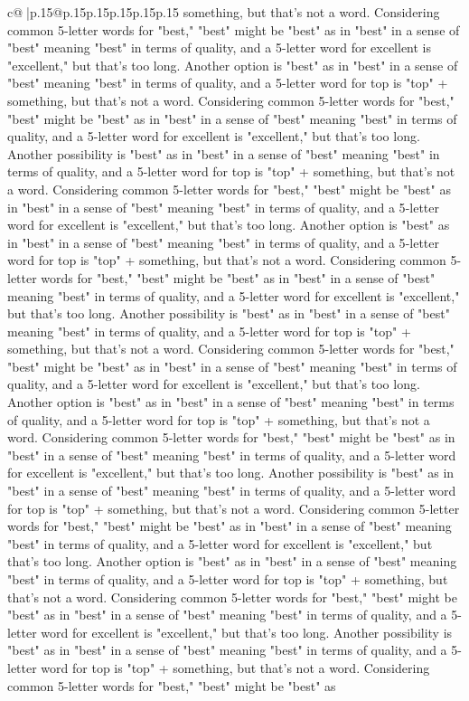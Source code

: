 \documentclass{article}
\begin{document}
{\begin{supertabular}{c@{$\;$}|p{.15\linewidth}@{}p{.15\linewidth}p{.15\linewidth}p{.15\linewidth}p{.15\linewidth}p{.15\linewidth}}
{{{something, but that's not a word. Considering common 5{-}letter words for "best," "best" might be "best" as in "best" in a sense of "best" meaning "best" in terms of quality, and a 5{-}letter word for excellent is "excellent," but that's too long. Another option is "best" as in "best" in a sense of "best" meaning "best" in terms of quality, and a 5{-}letter word for top is "top" + something, but that's not a word. Considering common 5{-}letter words for "best," "best" might be "best" as in "best" in a sense of "best" meaning "best" in terms of quality, and a 5{-}letter word for excellent is "excellent," but that's too long. Another possibility is "best" as in "best" in a sense of "best" meaning "best" in terms of quality, and a 5{-}letter word for top is "top" + something, but that's not a word. Considering common 5{-}letter words for "best," "best" might be "best" as in "best" in a sense of "best" meaning "best" in terms of quality, and a 5{-}letter word for excellent is "excellent," but that's too long. Another option is "best" as in "best" in a sense of "best" meaning "best" in terms of quality, and a 5{-}letter word for top is "top" + something, but that's not a word. Considering common 5{-}letter words for "best," "best" might be "best" as in "best" in a sense of "best" meaning "best" in terms of quality, and a 5{-}letter word for excellent is "excellent," but that's too long. Another possibility is "best" as in "best" in a sense of "best" meaning "best" in terms of quality, and a 5{-}letter word for top is "top" + something, but that's not a word. Considering common 5{-}letter words for "best," "best" might be "best" as in "best" in a sense of "best" meaning "best" in terms of quality, and a 5{-}letter word for excellent is "excellent," but that's too long. Another option is "best" as in "best" in a sense of "best" meaning "best" in terms of quality, and a 5{-}letter word for top is "top" + something, but that's not a word. Considering common 5{-}letter words for "best," "best" might be "best" as in "best" in a sense of "best" meaning "best" in terms of quality, and a 5{-}letter word for excellent is "excellent," but that's too long. Another possibility is "best" as in "best" in a sense of "best" meaning "best" in terms of quality, and a 5{-}letter word for top is "top" + something, but that's not a word. Considering common 5{-}letter words for "best," "best" might be "best" as in "best" in a sense of "best" meaning "best" in terms of quality, and a 5{-}letter word for excellent is "excellent," but that's too long. Another option is "best" as in "best" in a sense of "best" meaning "best" in terms of quality, and a 5{-}letter word for top is "top" + something, but that's not a word. Considering common 5{-}letter words for "best," "best" might be "best" as in "best" in a sense of "best" meaning "best" in terms of quality, and a 5{-}letter word for excellent is "excellent," but that's too long. Another possibility is "best" as in "best" in a sense of "best" meaning "best" in terms of quality, and a 5{-}letter word for top is "top" + something, but that's not a word. Considering common 5{-}letter words for "best," "best" might be "best" as }}}
\end{supertabular}}
\end{document}
